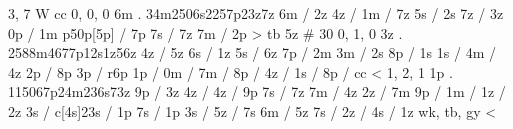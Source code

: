 3, 7
W
cc
0, 0, 0
6m . 
34m2506s2257p23z7z 
6m / 2z 
4z / 
1m / 7z 
5s / 2s 
7z / 3z 
0p / 1m 
p50p[5p] / 7p 
7s / 7z 
7m / 2p 
> tb 
5z # 30 
%
0, 1, 0 
3z . 
2588m4677p12s1z56z 
4z / 5z 
6s / 1z 
5s / 6z 
7p / 2m 
3m / 2s 
8p / 1s 
1s / 
4m / 4z 
2p / 8p 
3p / r6p 
1p / 
0m / 
7m / 
8p / 
4z / 
1s / 
8p / 
cc < 
%
1, 2, 1 
1p . 
115067p24m236s73z 
9p / 3z 
4z / 
4z / 9p
7s / 7z 
7m / 4z 
2z / 7m 
9p / 
1m / 
1z / 2z 
3s / 
c[4s]23s / 1p 
7s / 1p 
3s / 
5z / 7s 
6m / 5z 
7s / 
2z / 
4s / 1z 
wk, tb, gy < 